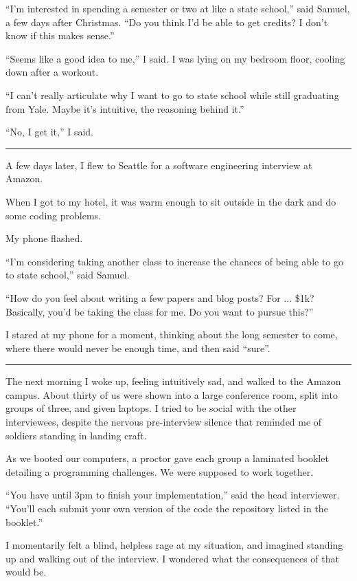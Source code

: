 ``I'm interested in spending a semester or two at like a state school,'' said
Samuel, a few days after Christmas.  ``Do you think I'd be able to get credits?
I don't know if this makes sense.''

``Seems like a good idea to me,'' I said.  I was lying on my bedroom floor,
cooling down after a workout.  

``I can't really articulate why I want to go to state school while still
graduating from Yale.   Maybe it's intuitive, the reasoning behind it.'' 

``No, I get it,'' I said. 

\plainfancybreak{12pt}{2}{* * *}

A few days later, I flew to Seattle for a software engineering interview at
Amazon.

When I got to my hotel, it was warm enough to sit outside in the dark and do
some coding problems.

My phone flashed.

``I'm considering taking another class to increase the chances of being able to
go to state school,'' said Samuel.  

``How do you feel about writing a few papers and blog posts?  For ... \$1k?
Basically, you'd be taking the class for me.  Do you want to pursue this?'' 

I stared at my phone for a moment, thinking about the long semester to come,
where there would never be enough time, and then said ``sure''.

\plainfancybreak{12pt}{2}{* * *}

The next morning I woke up, feeling intuitively sad, and walked to the Amazon
campus.  About thirty of us were shown into a large conference room, split into
groups of three, and given laptops.  I tried to be social with the other
interviewees, despite the nervous pre-interview silence that reminded me of
soldiers standing in landing craft.

As we booted our computers, a proctor gave each group a laminated booklet
detailing a programming challenges.  We were supposed to work together.

``You have until 3pm to finish your implementation,'' said the head interviewer.
``You'll each submit your own version of the code the repository listed in the
booklet.''

I momentarily felt a blind, helpless rage at my situation, and imagined standing
up and walking out of the interview.  I wondered what the consequences of that
would be.  

